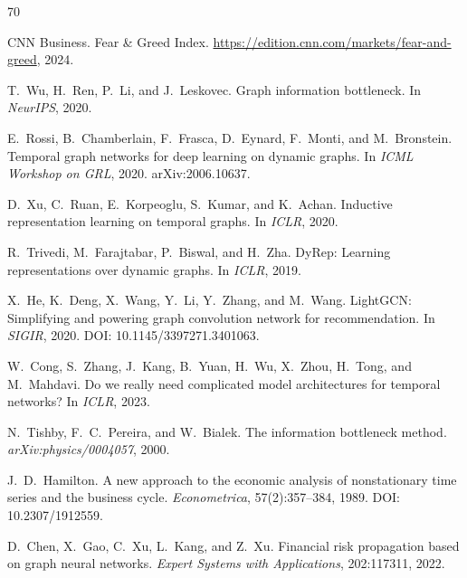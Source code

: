 \documentclass[11pt]{article}
\begin{document}

\begin{thebibliography}{70}

CNN Business.
\newblock Fear \& Greed Index.
\newblock \url{https://edition.cnn.com/markets/fear-and-greed}, 2024.

T.~Wu, H.~Ren, P.~Li, and J.~Leskovec.
\newblock Graph information bottleneck.
\newblock In \emph{NeurIPS}, 2020.

E.~Rossi, B.~Chamberlain, F.~Frasca, D.~Eynard, F.~Monti, and M.~Bronstein.
\newblock Temporal graph networks for deep learning on dynamic graphs.
\newblock In \emph{ICML Workshop on GRL}, 2020. arXiv:2006.10637.

D.~Xu, C.~Ruan, E.~Korpeoglu, S.~Kumar, and K.~Achan.
\newblock Inductive representation learning on temporal graphs.
\newblock In \emph{ICLR}, 2020.

R.~Trivedi, M.~Farajtabar, P.~Biswal, and H.~Zha.
\newblock DyRep: Learning representations over dynamic graphs.
\newblock In \emph{ICLR}, 2019.

X.~He, K.~Deng, X.~Wang, Y.~Li, Y.~Zhang, and M.~Wang.
\newblock LightGCN: Simplifying and powering graph convolution network for recommendation.
\newblock In \emph{SIGIR}, 2020. DOI: 10.1145/3397271.3401063.

W.~Cong, S.~Zhang, J.~Kang, B.~Yuan, H.~Wu, X.~Zhou, H.~Tong, and M.~Mahdavi.
\newblock Do we really need complicated model architectures for temporal networks?
\newblock In \emph{ICLR}, 2023.

N.~Tishby, F.~C.~Pereira, and W.~Bialek.
\newblock The information bottleneck method.
\newblock \emph{arXiv:physics/0004057}, 2000.

J.~D.~Hamilton.
\newblock A new approach to the economic analysis of nonstationary time series and the business cycle.
\newblock \emph{Econometrica}, 57(2):357--384, 1989. DOI: 10.2307/1912559.

D.~Chen, X.~Gao, C.~Xu, L.~Kang, and Z.~Xu.
\newblock Financial risk propagation based on graph neural networks.
\newblock \emph{Expert Systems with Applications}, 202:117311, 2022.


\end{thebibliography}
\end{document}
